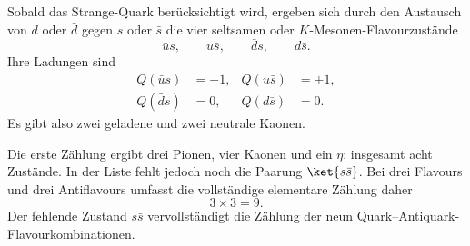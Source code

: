Sobald das Strange-Quark berücksichtigt wird, ergeben sich durch den Austausch von \(d\) oder \(\bar d\) gegen \(s\) oder \(\bar s\) die vier seltsamen oder \(K\)-Mesonen-Flavourzustände
\begin{equation}
\bar u s,\qquad u\bar s,\qquad \bar d s,\qquad d\bar s.
\end{equation}
Ihre Ladungen sind
\begin{align}
Q(\bar u s) &=-1,
&
Q(u\bar s) &=+1,
\\
Q(\bar d s) &=0,
&
Q(d\bar s) &=0.
\end{align}
Es gibt also zwei geladene und zwei neutrale Kaonen.

Die erste Zählung ergibt drei Pionen, vier Kaonen und ein \(\eta\): insgesamt acht Zustände. In der Liste fehlt jedoch noch die Paarung \(\ket{s\bar s}\). Bei drei Flavours und drei Antiflavours umfasst die vollständige elementare Zählung daher
\begin{equation}
3\times3=9.
\end{equation}
Der fehlende Zustand \(s\bar s\) vervollständigt die Zählung der neun Quark--Antiquark-Flavourkombinationen.
